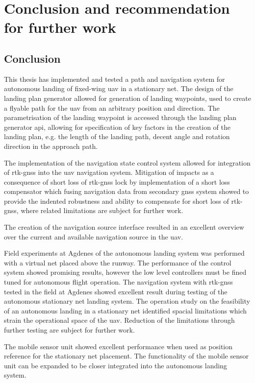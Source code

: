 \chapter{Conclusion and recommendation for further work}
\section{Conclusion}
This thesis has implemented and tested a path and navigation system for autonomous landing of fixed-wing \gls{uav} in a stationary net. The design of the landing plan generator allowed for generation of landing waypoints, used to create a flyable path for the \gls{uav} from an arbitrary position and direction. The parametrisation of the landing waypoint is accessed through the landing plan generator \gls{api}, allowing for specification of key factors in the creation of the landing plan, e.g. the length of the landing path, decent angle and rotation direction in the approach path.

The implementation of the navigation state control system allowed for integration of \gls{rtk-gnss} into the \gls{uav} navigation system. Mitigation of impacts as a consequence of short loss of \gls{rtk-gnss} lock by implementation of a short loss compensator which fusing navigation data from secondary \gls{gnss} system showed to provide the indented robustness and ability to compensate for short loss of \gls{rtk-gnss}, where related limitations are subject for further work.

The creation of the navigation source interface resulted in an excellent overview over the current and available navigation source in the \gls{uav}. 

Field experiments at Agdenes of the autonomous landing system was performed with a virtual net placed above the runway. The performance of the control system showed promising results, however the low level controllers must be fined tuned for autonomous flight operation. The navigation system with \gls{rtk-gnss} tested in the field at Agdenes showed excellent result during testing of the autonomous stationary net landing system. The operation study on the feasibility of an autonomous landing in a stationary net identified spacial limitations which strain the operational space of the \gls{uav}. Reduction of the limitations through further testing are subject for further work.  

The mobile sensor unit showed excellent performance when used as position reference for the stationary net placement. The functionality of the mobile sensor unit can be expanded to be closer integrated into the autonomous landing system.

